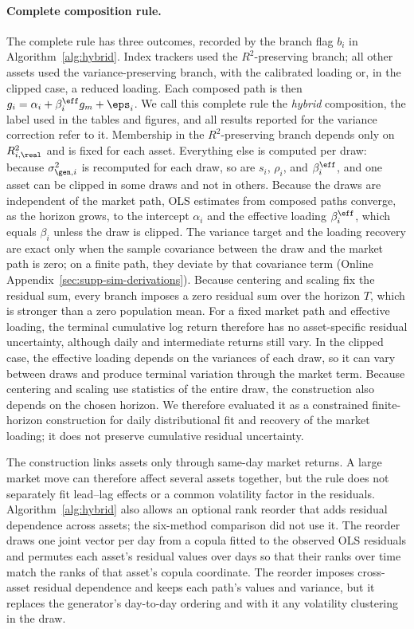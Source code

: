 \paragraph{Complete composition rule.}

The complete rule has three outcomes, recorded by the branch flag
$b_i$ in Algorithm~\ref{alg:hybrid}. Index trackers used the
$R^2$-preserving branch; all other assets used the
variance-preserving branch, with the calibrated loading or, in the
clipped case, a reduced loading. Each composed path is then
$g_i=\alpha_i+\beta_i^{\eff}g_m+\eps_i$. We call this complete rule
the \emph{hybrid} composition, the label used in the tables and
figures, and all results reported for the variance correction refer
to it. Membership in the $R^2$-preserving branch depends only on
$R^2_{i,\real}$ and is fixed for each asset. Everything else is
computed per draw: because $\sigma_{\gen,i}^2$ is recomputed for each
draw, so are $s_i$, $\rho_i$, and $\beta_i^{\eff}$, and one asset can be
clipped in some draws and not in others. Because the draws are independent of the market path, OLS estimates
from composed paths converge, as the horizon grows, to the intercept
$\alpha_i$ and the effective loading $\beta_i^{\eff}$, which equals
$\beta_i$ unless the draw is clipped. The variance target and the loading recovery are exact only when the
sample covariance between the draw and the market path is zero; on a
finite path, they deviate by that covariance term (Online
Appendix~\ref{sec:supp-sim-derivations}). Because centering and
scaling fix the residual sum, every branch imposes a zero residual sum over the horizon $T$, which is stronger than a zero population
mean. For a fixed market path and effective loading, the terminal
cumulative log return therefore has no asset-specific residual
uncertainty, although daily and intermediate returns still vary. In
the clipped case, the effective loading depends on the variances of
each draw, so it can vary between draws and produce terminal
variation through the market term. Because centering and scaling use
statistics of the entire draw, the construction also depends on the
chosen horizon. We therefore evaluated it as a constrained
finite-horizon construction for daily distributional fit and recovery
of the market loading; it does not preserve cumulative residual uncertainty.

The construction links assets only through same-day market returns.
A large market move can therefore affect several assets together, but
the rule does not separately fit lead--lag effects or a common
volatility factor in the residuals. Algorithm~\ref{alg:hybrid} also
allows an optional rank reorder that adds residual dependence across
assets; the six-method comparison did not use it. The reorder draws
one joint vector per day from a copula fitted to the observed OLS
residuals and permutes each asset's residual values over days so that
their ranks over time match the ranks of that asset's copula
coordinate. The reorder imposes cross-asset residual
dependence and keeps each path's values and variance, but it replaces the generator's day-to-day ordering and with it any
volatility clustering in the draw.

